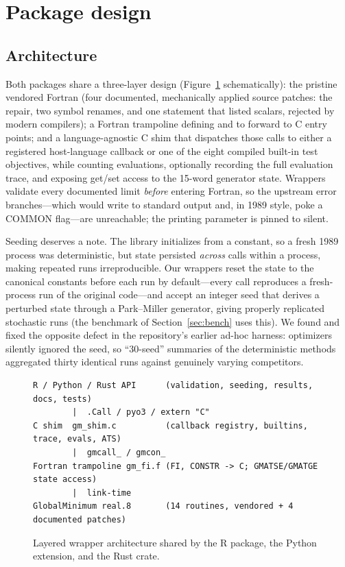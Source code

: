 \section{Package design}
\label{sec:packages}

\subsection{Architecture}

Both packages share a three-layer design (Figure~\ref{fig:arch}
schematically): the pristine vendored Fortran (four documented,
mechanically applied source patches: the  repair, two
symbol renames, and one  statement that listed scalars,
rejected by modern compilers); a Fortran trampoline defining 
and  to forward to C entry points; and a language-agnostic
C shim that dispatches those calls to either a registered host-language
callback or one of the eight compiled built-in test objectives, while
counting evaluations, optionally recording the full evaluation trace,
and exposing get/set access to the 15-word  generator state.
Wrappers validate every documented limit \emph{before} entering Fortran,
so the upstream error branches---which would write to standard output
and, in 1989 style, poke a COMMON flag---are unreachable; the printing
parameter is pinned to silent.

Seeding deserves a note. The library initializes  from a
 constant, so a fresh 1989 process was deterministic,
but state persisted \emph{across} calls within a process, making repeated
runs irreproducible. Our wrappers reset the state to the canonical
constants before each run by default---every call reproduces a fresh-process
run of the original code---and accept an integer seed that derives a
perturbed state through a Park--Miller generator, giving properly
replicated stochastic runs (the benchmark of Section~\ref{sec:bench}
uses this). We found and fixed the opposite defect in the repository's
earlier ad-hoc harness: optimizers silently ignored the seed, so
``30-seed'' summaries of the deterministic methods aggregated thirty
identical runs against genuinely varying competitors.

\begin{figure}[t]
\centering
\begin{lstlisting}
R / Python / Rust API      (validation, seeding, results, docs, tests)
        |  .Call / pyo3 / extern "C"
C shim  gm_shim.c          (callback registry, builtins, trace, evals, ATS)
        |  gmcall_ / gmcon_
Fortran trampoline gm_fi.f (FI, CONSTR -> C; GMATSE/GMATGE state access)
        |  link-time
GlobalMinimum real.8       (14 routines, vendored + 4 documented patches)
\end{lstlisting}
\caption{Layered wrapper architecture shared by the R package, the
Python extension, and the Rust crate.}
\label{fig:arch}
\end{figure}


